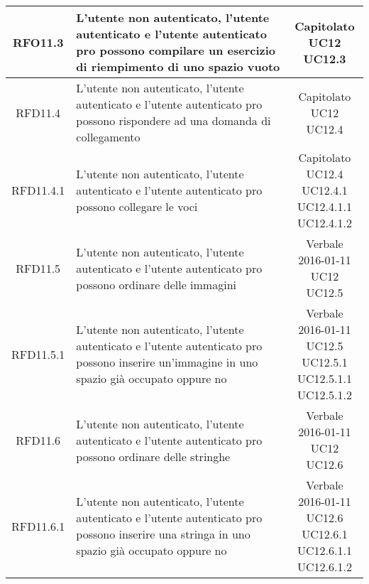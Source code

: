 \begin{longtable}{|c|>{\centering}m{7cm}|c|}
			 \hypertarget{{RFO11.3}}{{RFO11.3}} & L’utente non autenticato, l’utente
autenticato e l’utente autenticato pro
possono compilare un esercizio di
riempimento di uno spazio vuoto & \makecell{Capitolato\\ UC12 \\UC12.3 } \\ \hline
			 \hypertarget{{RFD11.4}}{{RFD11.4}} & L’utente non autenticato, l’utente
autenticato e l’utente autenticato pro
possono rispondere ad una domanda di
collegamento & \makecell{Capitolato\\ UC12 \\UC12.4 } \\ \hline
			 \hypertarget{{RFD11.4.1}}{{RFD11.4.1}} & L’utente non autenticato, l’utente
autenticato e l’utente autenticato pro
possono collegare le voci & \makecell{Capitolato\\ UC12.4 \\UC12.4.1 \\UC12.4.1.1 \\UC12.4.1.2 } \\ \hline
			 \hypertarget{{RFD11.5}}{{RFD11.5}} & L’utente non autenticato, l’utente
autenticato e l’utente autenticato pro
possono ordinare delle immagini & \makecell{Verbale 2016-01-11\\ UC12 \\UC12.5 } \\ \hline
			 \hypertarget{{RFD11.5.1}}{{RFD11.5.1}} & L’utente non autenticato, l’utente
autenticato e l’utente autenticato pro
possono inserire un’immagine in uno
spazio già occupato oppure no & \makecell{Verbale 2016-01-11\\ UC12.5 \\UC12.5.1 \\UC12.5.1.1 \\UC12.5.1.2 } \\ \hline
			 \hypertarget{{RFD11.6}}{{RFD11.6}} & L’utente non autenticato, l’utente
autenticato e l’utente autenticato pro
possono ordinare delle stringhe & \makecell{Verbale 2016-01-11\\ UC12 \\UC12.6 } \\ \hline
			 \hypertarget{{RFD11.6.1}}{{RFD11.6.1}} & L’utente non autenticato, l’utente
autenticato e l’utente autenticato pro
possono inserire una stringa in uno spazio
già occupato oppure no & \makecell{Verbale 2016-01-11\\ UC12.6 \\UC12.6.1 \\UC12.6.1.1 \\UC12.6.1.2 } \\ \hline

\end{longtable}
